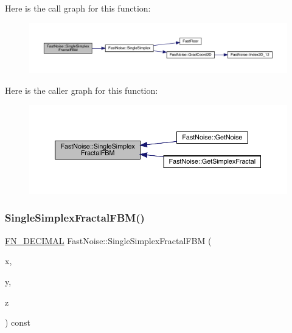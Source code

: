 Here is the call graph for this function\+:
\nopagebreak
\begin{figure}[H]
\begin{center}
\leavevmode
\includegraphics[width=350pt]{d1/dd8/class_fast_noise_af7e3a4be65f1e27d1af76111a382adbc_cgraph}
\end{center}
\end{figure}
Here is the caller graph for this function\+:
\nopagebreak
\begin{figure}[H]
\begin{center}
\leavevmode
\includegraphics[width=350pt]{d1/dd8/class_fast_noise_af7e3a4be65f1e27d1af76111a382adbc_icgraph}
\end{center}
\end{figure}
\mbox{\label{class_fast_noise_a2ac44ef2c9843f3024a3f0be9a47526b}} 
\subsubsection{\texorpdfstring{Single\+Simplex\+Fractal\+F\+B\+M()}{SingleSimplexFractalFBM()}\hspace{0.1cm}{\footnotesize\ttfamily [2/2]}}
{\footnotesize\ttfamily \mbox{\hyperlink{_fast_noise_8h_a75a9ef6d2541c4921815b885bfd449c3}{F\+N\+\_\+\+D\+E\+C\+I\+M\+AL}} Fast\+Noise\+::\+Single\+Simplex\+Fractal\+F\+BM (\begin{DoxyParamCaption}\item[{\mbox{\hyperlink{_fast_noise_8h_a75a9ef6d2541c4921815b885bfd449c3}{F\+N\+\_\+\+D\+E\+C\+I\+M\+AL}}}]{x,  }\item[{\mbox{\hyperlink{_fast_noise_8h_a75a9ef6d2541c4921815b885bfd449c3}{F\+N\+\_\+\+D\+E\+C\+I\+M\+AL}}}]{y,  }\item[{\mbox{\hyperlink{_fast_noise_8h_a75a9ef6d2541c4921815b885bfd449c3}{F\+N\+\_\+\+D\+E\+C\+I\+M\+AL}}}]{z }\end{DoxyParamCaption}) const\hspace{0.3cm}{\ttfamily [private]}}

